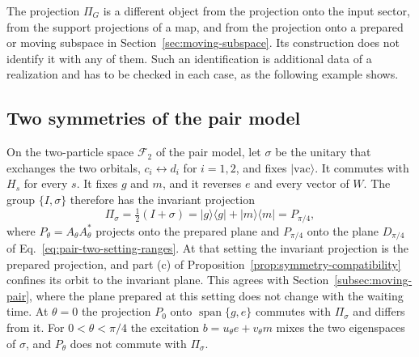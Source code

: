 \documentclass[11pt]{article}
\theoremstyle{definition}
\DeclareMathOperator{\Span}{span}
\newcommand{\ket}[1]{\lvert #1\rangle}
\newcommand{\bra}[1]{\langle #1\rvert}
\begin{document}
The projection $\Pi_G$ is a different object from the projection onto the input sector, from the support projections of a map, and from the projection onto a prepared or moving subspace in Section~\ref{sec:moving-subspace}. Its construction does not identify it with any of them. Such an identification is additional data of a realization and has to be checked in each case, as the following example shows.

\subsection{Two symmetries of the pair model}
\label{subsec:symmetry-pair}

On the two-particle space $\mathcal F_2$ of the pair model, let $\sigma$ be the unitary that exchanges the two orbitals, $c_i\leftrightarrow d_i$ for $i=1,2$, and fixes $\ket{\mathrm{vac}}$. It commutes with $H_s$ for every $s$. It fixes $g$ and $m$, and it reverses $e$ and every vector of $W$. The group $\{I,\sigma\}$ therefore has the invariant projection
\begin{equation}
 \Pi_\sigma=\tfrac12(I+\sigma)=\ket{g}\bra{g}+\ket{m}\bra{m}=P_{\pi/4},
 \label{eq:symmetry-pair-exchange}
\end{equation}
where $P_\theta=A_\theta A_\theta^*$ projects onto the prepared plane and $P_{\pi/4}$ onto the plane $D_{\pi/4}$ of Eq.~\eqref{eq:pair-two-setting-ranges}. At that setting the invariant projection is the prepared projection, and part (c) of Proposition~\ref{prop:symmetry-compatibility} confines its orbit to the invariant plane. This agrees with Section~\ref{subsec:moving-pair}, where the plane prepared at this setting does not change with the waiting time. At $\theta=0$ the projection $P_0$ onto $\Span\{g,e\}$ commutes with $\Pi_\sigma$ and differs from it. For $0<\theta<\pi/4$ the excitation $b=u_\theta e+v_\theta m$ mixes the two eigenspaces of $\sigma$, and $P_\theta$ does not commute with $\Pi_\sigma$.
\end{document}
